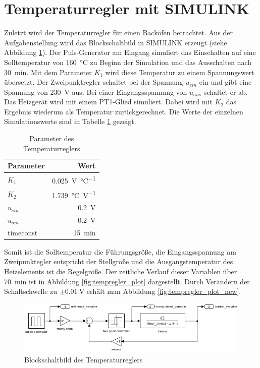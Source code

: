 \documentclass[
    paper=a4,
    fontsize=10pt,
    DIV=13,
    oneside,
]{scrartcl}
\begin{document}
    \clearpage

\section{Temperaturregler mit SIMULINK}
    Zuletzt wird der Temperaturregler für einen Backofen betrachtet. Aus der Aufgabenstellung \cite{versuch1} wird das Blockschaltbild in SIMULINK erzeugt (siehe Abbildung \ref{fig:tempregler_block}). Der Puls-Generator am Eingang simuliert das Einschalten auf eine Solltemperatur von \SI{160}{\celsius} zu Beginn der Simulation und das Ausschalten nach \SI{30}{\minute}. Mit dem Parameter \(K_1\) wird diese Temperatur zu einem Spannungswert übersetzt. Der Zweipunktregler schaltet bei der Spannung \(u_{ein}\) ein und gibt eine Spannung von \SI{230}{\volt} aus. Bei einer Eingangsspannung von \(u_{aus}\) schaltet er ab. Das Heizgerät wird mit einem PT1-Glied simuliert. Dabei wird mit \(K_2\) das Ergebnis wiederum als Temperatur zurückgerechnet. Die Werte der einzelnen Simulationswerte sind in Tabelle \ref{tab:tempregler} gezeigt. 

    \begin{table}[hbt]
        \centering
        \caption{Parameter des Temperaturreglers}
        \label{tab:tempregler}
        \begin{tabular}{lr}\toprule
            Parameter   &   Wert\\\midrule
            \(K_1\)     & \SI{0.025}{\volt\per\celsius}\\\addlinespace
            \(K_2\)     & \SI{1,739}{\celsius\per\volt}\\\addlinespace
            \(u_{ein}\) & \SI{0.2}{\volt}\\
            \(u_{aus}\) & \SI{-0.2}{\volt}\\
            timeconst   & \SI{15}{\minute}\\\bottomrule
        \end{tabular}
    \end{table}
    
    Somit ist die Solltemperatur die Führungsgröße, die Eingangsspannung am Zweipunktegler entspricht der Stellgröße und die Ausgangstemperatur des Heizelements ist die Regelgröße. Der zeitliche Verlauf dieser Variablen über \SI{70}{\minute} ist in Abbildung \ref{fig:tempregler_plot} dargestellt. Durch Verändern der Schaltschwelle zu  \(\pm\SI{0.01}{\volt}\) erhält man Abbildung \ref{fig:tempregler_plot_new}.

    \begin{figure}
        \centering
        \includegraphics[width=\imagewidth]{../versuch1/tempregler_block.png}
        \caption{Blockschaltbild des Temperaturreglers}
        \label{fig:tempregler_block}
    \end{figure}    
\end{document}
